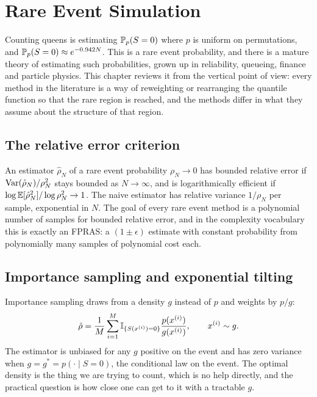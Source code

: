 \chapter{Rare Event Simulation}
\label{ch:rareevent}

Counting queens is estimating $\mathbb{P}_p(S = 0)$ where $p$ is uniform on permutations, and $\mathbb{P}_p(S = 0) \approx e^{-0.942 N}$. This is a rare event probability, and there is a mature theory of estimating such probabilities, grown up in reliability, queueing, finance and particle physics. This chapter reviews it from the vertical point of view: every method in the literature is a way of reweighting or rearranging the quantile function so that the rare region is reached, and the methods differ in what they assume about the structure of that region.

\section{The relative error criterion}

An estimator $\hat\rho_N$ of a rare event probability $\rho_N \to 0$ has bounded relative error if $\operatorname{Var}(\hat\rho_N) / \rho_N^2$ stays bounded as $N \to \infty$, and is logarithmically efficient if $\log \mathbb{E}[\hat\rho_N^2] / \log \rho_N^2 \to 1$. The naive estimator has relative variance $1/\rho_N$ per sample, exponential in $N$. The goal of every rare event method is a polynomial number of samples for bounded relative error, and in the complexity vocabulary this is exactly an FPRAS: a $(1 \pm \epsilon)$ estimate with constant probability from polynomially many samples of polynomial cost each.

\section{Importance sampling and exponential tilting}

Importance sampling draws from a density $g$ instead of $p$ and weights by $p/g$:
\[
\hat\rho = \frac{1}{M} \sum_{i=1}^{M} \mathbb{I}_{\{S(x^{(i)}) = 0\}} \frac{p(x^{(i)})}{g(x^{(i)})} , \qquad x^{(i)} \sim g .
\]
The estimator is unbiased for any $g$ positive on the event and has zero variance when $g = g^* = p(\cdot \mid S = 0)$, the conditional law on the event. The optimal density is the thing we are trying to count, which is no help directly, and the practical question is how close one can get to it with a tractable $g$.

